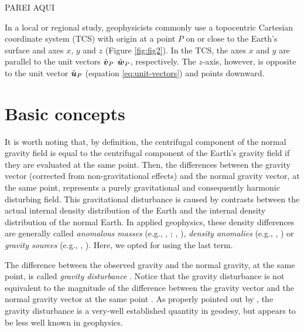 \documentclass[extra]{gji}
\begin{document}
PAREI AQUI

In a local or regional study, geophysicists commonly use a topocentric 
Cartesian coordinate system (TCS) with origin at a point $P$ on or 
close to the Earth's surface and axes $x$, $y$ and $z$ (Figure 
\ref{fig:fig2}). In the TCS, the axes $x$ and $y$ are parallel to the unit vectors $\hat{\mitbf{v}}_{P}$ $\hat{\mitbf{w}}_{P}$, respectively. 
The $z$-axis, however, is opposite to the unit vector $\hat{\mitbf{u}}_{P}$ (equation \ref{eq:unit-vectors}) and points downward.


\section{Basic concepts}

It is worth noting that, by definition, 
the centrifugal component of the normal gravity field is
equal to the centrifugal component of the Earth's gravity
field if they are evaluated at the same point.
Then, the differences between the gravity vector
(corrected from non-gravitational effects) 
and the normal gravity vector, at the same point, represents a purely 
gravitational and consequently harmonic disturbing field.
This gravitational disturbance 
is caused by contrasts between the actual internal 
density distribution of the Earth and the internal density 
distribution of the normal Earth.
In applied geophysics, these density differences are generally 
called \textit{anomalous masses} (e.g., \citeauthor{hammer1945}, 
\citeyear{hammer1945}; \citeauthor{lafehr1965}, \citeyear{lafehr1965}),
\textit{density anomalies} (e.g., \citeauthor{forsberg1984}, \citeyear{forsberg1984})
or \textit{gravity sources} (e.g., \citeauthor{blakely1996}, 
\citeyear{blakely1996}). Here, we opted for using the last term.

The difference between the observed gravity and the
normal gravity, at the same point, is called \textit{gravity disturbance}
\citep{heiskanen-moritz1967, hofmann-wellenhof-moritz2005}.
Notice that the gravity disturbance is not equivalent to the
magnitude of the difference between the gravity vector
and the normal gravity vector at the same point 
\citep{barthelmes2013, sanso_sideris2013}.
As properly pointed out by \citet{hackney-featherstone2003},
the gravity disturbance is a very-well established quantity in geodesy,
but appears to be less well known in geophysics.
\end{document}
